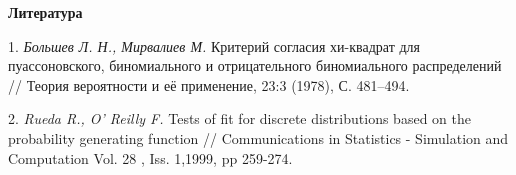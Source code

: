 \smallskip \centerline{\bf Литература}\nopagebreak

1. {\it Большев Л. Н., Мирвалиев М.} Критерий согласия хи-квадрат для пуассоновского, биномиального и отрицательного биномиального распределений // Теория вероятности и её применение, 23:3 (1978), С. 481--494.

2. {\it Rueda R., O' Reilly F.} Tests of fit for discrete distributions based on the probability generating function // Communications in Statistics - Simulation and Computation Vol. 28 , Iss. 1,1999, pp 259-274.
